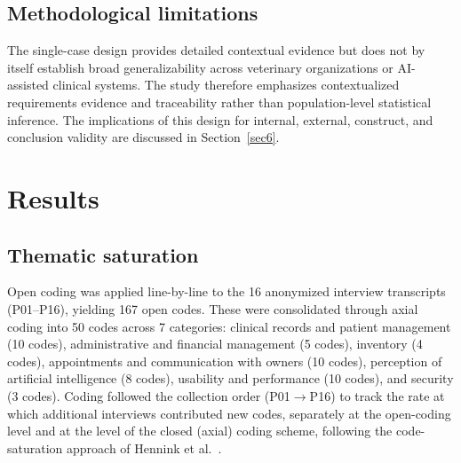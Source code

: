 \documentclass[pdflatex,sn-mathphys-num,Numbered]{sn-jnl}
\begin{document}
\subsection{Methodological limitations}\label{subsec9}

The single-case design provides detailed contextual evidence but does not by itself establish broad generalizability across veterinary organizations or AI-assisted clinical systems. The study therefore emphasizes contextualized requirements evidence and traceability rather than population-level statistical inference. The implications of this design for internal, external, construct, and conclusion validity are discussed in Section~\ref{sec6}.


\section{Results}\label{sec4}

\subsection{Thematic saturation}\label{res:saturation}

Open coding was applied line-by-line to the 16 anonymized interview transcripts (P01--P16), yielding 167 open codes. These were consolidated through axial coding into 50 codes across 7 categories: clinical records and patient management (10 codes), administrative and financial management (5 codes), inventory (4 codes), appointments and communication with owners (10 codes), perception of artificial intelligence (8 codes), usability and performance (10 codes), and security (3 codes). Coding followed the collection order (P01$\rightarrow$P16) to track the rate at which additional interviews contributed new codes, separately at the open-coding level and at the level of the closed (axial) coding scheme, following the code-saturation approach of Hennink et al.~\cite{hennink2017}.
\end{document}
